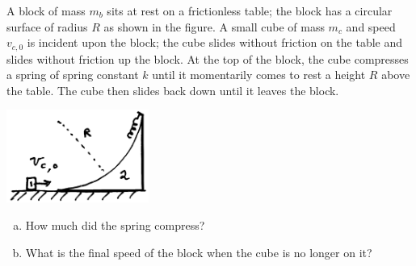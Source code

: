 \documentclass{esg8012exam}
\begin{document}
\begin{problem}{30}
  A block of mass $m_b$ sits at rest on a frictionless table; the block has a circular surface of radius $R$ as shown in the figure. A small cube of mass $m_c$ and speed $v_{c,0}$ is incident upon the block; the cube slides without friction on the table and slides without friction up the block. At the top of the block, the cube compresses a spring of spring constant $k$ until it momentarily comes to rest a height $R$ above the table. The cube then slides back down until it leaves the block.
  \begin{center}\includegraphics[width=0.35\textwidth]{exam2_p1_1}\end{center}
  \begin{enumerate}[(a)]
    \item How much did the spring compress?
    \item What is the final speed of the block when the cube is no longer on it?
  \end{enumerate}
\end{problem}
\end{document}

